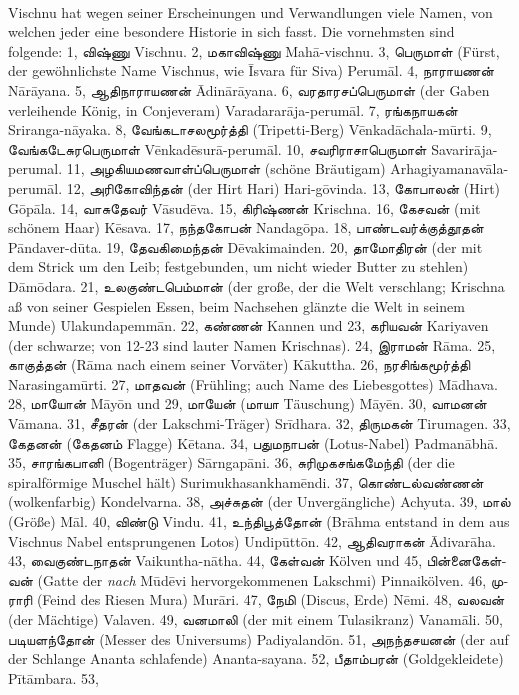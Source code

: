 \documentclass{article}
\newcommand{\TamilText}[1]{\texttamil{#1}}
\newcommand{\tam}[1]{\TamilText{#1}}
\begin{document}
\paragraph{}
Vischnu hat wegen seiner Erscheinungen und Verwandlungen viele Namen, von welchen jeder eine besondere Historie in sich fasst. Die vornehmsten sind folgende: 1, \tam{விஷ்ணு} Vischnu. 2, \tam{மகாவிஷ்ணு} Mah\={a}-vischnu. 3, \tam{பெருமாள்} (Fürst, der gewöhnlichste Name Vischnus, wie \={I}svara für Siva) Perum\={a}l. 4, \tam{நாராயணன்} N\={a}r\={a}yana. 5, \tam{ஆதிநாராயணன்} \={A}din\={a}r\={a}yana. 6, \tam{வரதாரசப்பெருமாள்} (der Gaben verleihende König, in Conjeveram) Varadarar\={a}ja-perum\={a}l. 7, \tam{ரங்கநாயகன்} Sriranga-n\={a}yaka. 8, \tam{வேங்கடாசலமூர்த்தி} (Tripetti-Berg) V\={e}nkad\={a}chala-m\={u}rti. 9, \tam{வேங்கடேசுரபெருமாள்} V\={e}nkad\={e}sur\={a}-perum\={a}l. 10, \tam{சவரிராசாபெருமாள்} Savarir\={a}ja-perumal. 11, \tam{அழகியமணவாள்ப்பெருமாள்} (schöne Bräutigam) Arhagiyamanav\={a}la-perum\={a}l. 12, \tam{அரிகோவிந்தன்} (der Hirt Hari) Hari-g\={o}vinda. 13, \tam{கோபாலன்} (Hirt) G\={o}p\={a}la. 14, \tam{வாசுதேவர்} V\={a}sud\={e}va. 15, \tam{கிரிஷ்ணன்} Krischna. 16, \tam{கேசவன்} (mit schönem Haar) K\={e}sava. 17, \tam{நந்தகோபன்} Nandag\={o}pa. 18, \tam{பாண்டவர்க்குத்தூதன்} P\={a}ndaver-d\={u}ta. 19, \tam{தேவகிமைந்தன்} D\={e}vakimainden. 20, \tam{தாமோதிரன்} (der mit dem Strick um den Leib; festgebunden, um nicht wieder Butter zu stehlen) D\={a}m\={o}dara. 21, \tam{உலகுண்டபெம்மான்} (der große, der die Welt verschlang; Krischna aß von seiner Gespielen Essen, beim Nachsehen glänzte die Welt in seinem Munde) Ulakundapemm\={a}n. 22, \tam{கண்ணன்} Kannen und 23, \tam{கரியவன்} Kariyaven (der schwarze; von 12-23 sind lauter Namen Krischnas). 24, \tam{இராமன்} R\={a}ma. 25, \tam{காகுத்தன்} (R\={a}ma nach einem seiner Vorväter) K\={a}kuttha. 26, \tam{நரசிங்கமூர்த்தி} Narasingam\={u}rti. 27, \tam{மாதவன்} (Frühling; auch Name des Liebesgottes) M\={a}dhava. 28, \tam{மாயோன்} M\={a}y\={o}n und 29, \tam{மாயேன்} (\tam{மாயா} Täuschung) M\={a}y\={e}n. 30, \tam{வாமனன்} V\={a}mana. 31, \tam{சீதரன்} (der Lakschmi-Träger) Sr\={i}dhara. 32, \tam{திருமகன்} Tirumagen. 33, \tam{கேதனன்} (\tam{கேதனம்} Flagge) K\={e}tana. 34, \tam{பதுமநாபன்} (Lotus-Nabel) Padman\={a}bh\={a}. 35, \tam{சாரங்கபானி} (Bogenträger) S\={a}rngap\={a}ni. 36, \tam{சுரிமுகசங்கமேந்தி} (der die spiralförmige Muschel hält) Surimukhasankham\={e}ndi. 37, \tam{கொண்டல்வண்ணன்} (wolkenfarbig) Kondelvarna. 38, \tam{அச்சுதன்} (der Unvergängliche) Achyuta. 39, \tam{மால்} (Größe) M\={a}l. 40, \tam{விண்டு} Vindu. 41, \tam{உந்திபூத்தோன்} (Br\={a}hma entstand in dem aus Vischnus Nabel entsprungenen Lotos) Undip\={u}tt\={o}n. 42, \tam{ஆதிவராகன்} \={A}divar\={a}ha. 43, \tam{வைகுண்டநாதன்} Vaikuntha-n\={a}tha. 44, \tam{கேள்வன்} Kölven und 45, \tam{பின்னைகேள்வன்} (Gatte der \emph{nach} M\={u}d\={e}vi hervorgekommenen Lakschmi) Pinnaikölven. 46, \tam{முராரி} (Feind des Riesen Mura) Mur\={a}ri. 47, \tam{நேமி} (Discus, Erde) N\={e}mi. 48, \tam{வலவன்} (der Mächtige) Valaven. 49, \tam{வனமாலி} (der mit einem Tulasikranz) Vanam\={a}li. 50, \tam{படியளந்தோன்} (Messer des Universums) Padiyaland\={o}n. 51, \tam{அநந்தசயனன்} (der auf der Schlange Ananta schlafende) Ananta-sayana. 52, \tam{பீதாம்பரன்} (Goldgekleidete) P\={i}t\={a}mbara. 53, 
\end{document}
